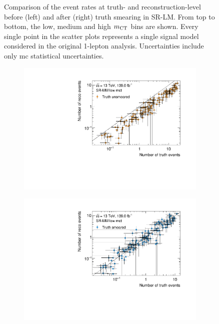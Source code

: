 \begin{figure}
\begin{subfigure}[b]{0.49\linewidth}
	\end{subfigure}
	\caption{Comparison of the event rates at truth- and reconstruction-level before (left) and after (right) truth smearing in SR-LM. From top to bottom, the low, medium and high $m_{\textrm{CT}}$ bins are shown. Every single point in the scatter plots represents a single signal model considered in the original 1-lepton analysis. Uncertainties include only \gls{mc} statistical uncertainties.}
	\label{fig:smearing_signal_regions_1}
\end{figure}

\begin{figure}
	\centering
	\begin{subfigure}[b]{0.49\linewidth}
		\centering\includegraphics[width=\textwidth]{yields_SR-MM_low_mct_unsmeared}
	\end{subfigure}\hfill
	\begin{subfigure}[b]{0.49\linewidth}
		\centering\includegraphics[width=\textwidth]{yields_SR-MM_low_mct_smeared}

\end{subfigure}
\end{figure}
